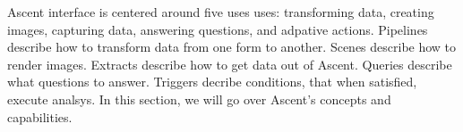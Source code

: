 Ascent interface is centered around five uses uses:
transforming data, creating images, capturing data, answering questions,
and adpative actions.
%
Pipelines describe how to transform data from one form to another.
%
Scenes describe how to render images.
%
Extracts describe how to get data out of Ascent.
%
Queries describe what questions to answer.
%
Triggers decribe conditions, that when satisfied, execute analsys.
%
In this section, we will go over Ascent's concepts and capabilities.
